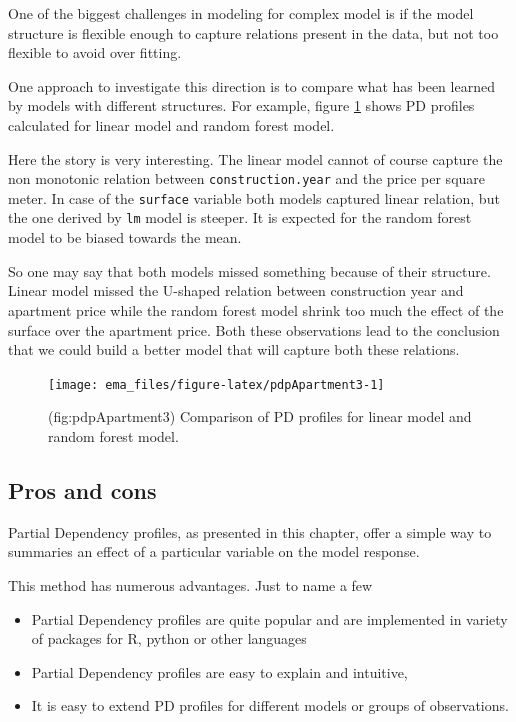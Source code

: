 \documentclass[12pt,]{krantz}
\providecommand{\tightlist}{%
  \setlength{\itemsep}{0pt}\setlength{\parskip}{0pt}}
\begin{document}
One of the biggest challenges in modeling for complex model is if the model structure is flexible enough to capture relations present in the data, but not too flexible to avoid over fitting.

One approach to investigate this direction is to compare what has been learned by models with different structures. For example, figure \ref{fig:pdpApartment3} shows PD profiles calculated for linear model and random forest model.

Here the story is very interesting. The linear model cannot of course capture the non monotonic relation between \texttt{construction.year} and the price per square meter. In case of the \texttt{surface} variable both models captured linear relation, but the one derived by \texttt{lm} model is steeper. It is expected for the random forest model to be biased towards the mean.

So one may say that both models missed something because of their structure. Linear model missed the U-shaped relation between construction year and apartment price while the random forest model shrink too much the effect of the surface over the apartment price.
Both these observations lead to the conclusion that we could build a better model that will capture both these relations.

\begin{figure}

{\centering \texttt{[image: ema\_files/figure-latex/pdpApartment3-1]} 

}

\caption{(fig:pdpApartment3) Comparison of PD profiles for linear model and random forest model.}\label{fig:pdpApartment3}
\end{figure}

\hypertarget{PDPProsCons}{%
\subsection{Pros and cons}\label{PDPProsCons}}

Partial Dependency profiles, as presented in this chapter, offer a simple way to summaries an effect of a particular variable on the model response.

This method has numerous advantages. Just to name a few

\begin{itemize}
\tightlist
\item
  Partial Dependency profiles are quite popular and are implemented in variety of packages for R, python or other languages
\item
  Partial Dependency profiles are easy to explain and intuitive,
\item
  It is easy to extend PD profiles for different models or groups of observations.
\end{itemize}
\end{document}
